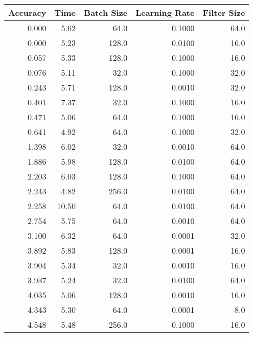 \begin{table}[htpb]
\centering
\begin{adjustbox}{totalheight=\baselineskip}
\begin{tabular}{rrrrr}
\toprule
 Accuracy &   Time &  Batch Size &  Learning Rate &  Filter Size \\
\midrule
    0.000 &   5.62 &        64.0 &         0.1000 &         64.0 \\
    0.000 &   5.23 &       128.0 &         0.0100 &         16.0 \\
    0.057 &   5.33 &       128.0 &         0.1000 &         16.0 \\
    0.076 &   5.11 &        32.0 &         0.1000 &         32.0 \\
    0.243 &   5.71 &       128.0 &         0.0010 &         32.0 \\
    0.401 &   7.37 &        32.0 &         0.1000 &         16.0 \\
    0.471 &   5.06 &        64.0 &         0.1000 &         16.0 \\
    0.641 &   4.92 &        64.0 &         0.1000 &         32.0 \\
    1.398 &   6.02 &        32.0 &         0.0010 &         64.0 \\
    1.886 &   5.98 &       128.0 &         0.0100 &         64.0 \\
    2.203 &   6.03 &       128.0 &         0.1000 &         64.0 \\
    2.243 &   4.82 &       256.0 &         0.0100 &         64.0 \\
    2.258 &  10.50 &        64.0 &         0.0100 &         64.0 \\
    2.754 &   5.75 &        64.0 &         0.0010 &         64.0 \\
    3.100 &   6.32 &        64.0 &         0.0001 &         32.0 \\
    3.892 &   5.83 &       128.0 &         0.0001 &         16.0 \\
    3.904 &   5.34 &        32.0 &         0.0010 &         16.0 \\
    3.937 &   5.24 &        32.0 &         0.0100 &         64.0 \\
    4.035 &   5.06 &       128.0 &         0.0010 &         16.0 \\
    4.343 &   5.30 &        64.0 &         0.0001 &          8.0 \\
    4.548 &   5.48 &       256.0 &         0.1000 &         16.0 \\

\end{tabular}
\end{adjustbox}
\end{table}
